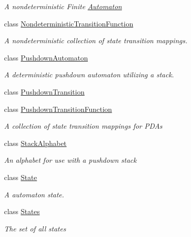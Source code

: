 \begin{DoxyCompactItemize}
\begin{DoxyCompactList}\small\item\em A nondeterministic Finite \mbox{\hyperlink{class_system_1_1_automata_1_1_automaton}{Automaton}} \end{DoxyCompactList}\item 
class \mbox{\hyperlink{class_system_1_1_automata_1_1_nondeterministic_transition_function}{Nondeterministic\+Transition\+Function}}
\begin{DoxyCompactList}\small\item\em A nondeterministic collection of state transition mappings. \end{DoxyCompactList}\item 
class \mbox{\hyperlink{class_system_1_1_automata_1_1_pushdown_automaton}{Pushdown\+Automaton}}
\begin{DoxyCompactList}\small\item\em A deterministic pushdown automaton utilizing a stack. \end{DoxyCompactList}\item 
class \mbox{\hyperlink{class_system_1_1_automata_1_1_pushdown_transition}{Pushdown\+Transition}}
\item 
class \mbox{\hyperlink{class_system_1_1_automata_1_1_pushdown_transition_function}{Pushdown\+Transition\+Function}}
\begin{DoxyCompactList}\small\item\em A collection of state transition mappings for P\+D\+As \end{DoxyCompactList}\item 
class \mbox{\hyperlink{class_system_1_1_automata_1_1_stack_alphabet}{Stack\+Alphabet}}
\begin{DoxyCompactList}\small\item\em An alphabet for use with a pushdown stack \end{DoxyCompactList}\item 
class \mbox{\hyperlink{class_system_1_1_automata_1_1_state}{State}}
\begin{DoxyCompactList}\small\item\em A automaton state. \end{DoxyCompactList}\item 
class \mbox{\hyperlink{class_system_1_1_automata_1_1_states}{States}}
\begin{DoxyCompactList}\small\item\em The set of all states \end{DoxyCompactList}\item 

\end{DoxyCompactItemize}
